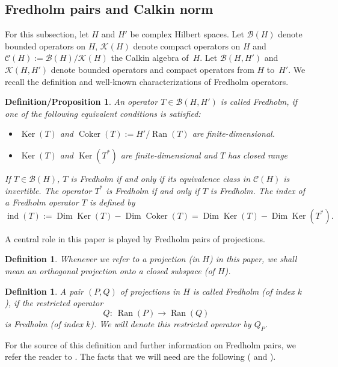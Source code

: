 \documentclass[10pt,a4paper]{amsart}
\numberwithin{equation}{section}
\newtheorem{defprop}[Theorem]{Definition/Proposition}
\newtheorem{Definition}[Theorem]{Definition}
\DeclareMathOperator{\Ran}{Ran}
\DeclareMathOperator{\Ker}{Ker}
\DeclareMathOperator{\Coker}{Coker}
\DeclareMathOperator{\ind}{ind}
\DeclareMathOperator{\Dim}{Dim}
\begin{document}
	\subsection{Fredholm pairs and Calkin norm}
	For this subsection, let $H$ and $H'$ be complex Hilbert spaces. Let $\mathcal{B}(H)$ denote bounded operators on $H$, $\mathcal{K}(H)$ denote compact operators on $H$ and $\mathcal C(H):= \mathcal{B}(H)/\mathcal{K}(H)$ the Calkin algebra of~$H$. Let $\mathcal{B}(H,H')$ and $\mathcal{K}(H,H')$ denote bounded operators and compact operators from $H$ to~$H'$.
	We recall the definition and well-known characterizations of Fredholm operators.
	\begin{defprop}
		An operator $T\in \mathcal{B}(H,H')$ is called Fredholm, if one of the following equivalent conditions is satisfied:
		\begin{itemize}\itemsep=0pt
			\item $\Ker(T)$ and $\Coker(T):=H'/\Ran(T)$ are finite-dimensional.
			\item $\Ker(T)$ and $\Ker(T^*)$ are finite-dimensional and $T$ has closed range
		\end{itemize}
		If $T\in \mathcal{B}(H)$, $T$ is Fredholm if and only if its equivalence class in $\mathcal{C}(H)$ is invertible. The operator $T^*$ is Fredholm if and only if $T$ is Fredholm. The index of a Fredholm operator $T$ is defined by
		\[\ind(T):=\Dim\Ker(T)-\Dim\Coker(T)=\Dim\Ker(T)-\Dim\Ker(T^*).\]
	\end{defprop}
	A central role in this paper is played by Fredholm pairs of projections.
	\begin{Definition}
		Whenever we refer to a projection (in $H$) in this paper, we shall mean an orthogonal projection onto a closed subspace (of $H$).
	\end{Definition}
	\begin{Definition}
		A pair $(P,Q)$ of projections in $H$ is called Fredholm (of index $k$), if the restricted operator
		\[Q\colon\ \Ran(P)\rightarrow\Ran(Q)\]
		is Fredholm (of index $k$). We will denote this restricted operator by $Q_P$.
	\end{Definition}
	 For the source of this definition and further information on Fredholm pairs, we refer the reader to \cite{ASS}. The facts that we will need are the following (\cite[Theorem~3.4 and Proposition~3.1]{ASS} and \cite[Lemma~3.2]{LFP}).
\end{document}
